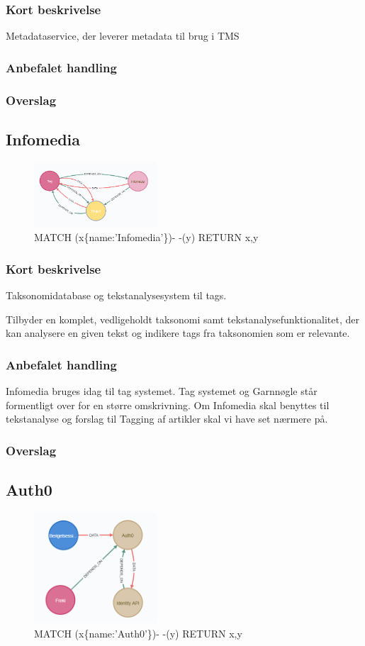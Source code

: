 \documentclass{article}
\begin{document}
\subsubsection{Kort beskrivelse}
Metadataservice, der leverer metadata til brug i TMS
\subsubsection{Anbefalet handling}
\subsubsection{Overslag}


\subsection{Infomedia}
\begin{figure}[h]
\includegraphics[width=130pt]{Infomedia.PNG}
\caption{MATCH (x\{name:'Infomedia'\})- -(y) RETURN x,y}
\end{figure}
\subsubsection{Kort beskrivelse}
Taksonomidatabase og tekstanalysesystem til tags.

Tilbyder en komplet, vedligeholdt taksonomi samt tekstanalysefunktionalitet, der kan analysere en given tekst og indikere tags fra taksonomien som er relevante.

\subsubsection{Anbefalet handling}
Infomedia bruges idag til tag systemet. Tag systemet og Garnnøgle står formentligt over for en større omskrivning. Om Infomedia skal benyttes til tekstanalyse og forslag til Tagging af artikler skal vi have set nærmere på.
\subsubsection{Overslag}


\subsection{Auth0}
\begin{figure}[h]
\includegraphics[width=130pt]{Auth0.PNG}
\caption{MATCH (x\{name:'Auth0'\})- -(y) RETURN x,y}
\end{figure}
\end{document}
